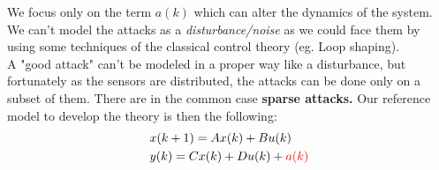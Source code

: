 \noindent
We focus only on the term $a(k)$ which can alter the dynamics of the system. We can't model the attacks as a \textit{disturbance/noise} as we could face them by using some techniques of the classical control theory (eg. Loop shaping).\\
A "good attack" can't be modeled in a proper way like a disturbance, but fortunately as the sensors are distributed, the attacks can be done only on a subset of them. There are in the common case \textbf{sparse attacks.}
Our reference model to develop the theory is then the following: 
\begin{align*}
    &x(k+1)=Ax(k)+Bu(k)\\
    &y(k)=Cx(k)+Du(k)+{\color{red}a(k)}
\end{align*}


